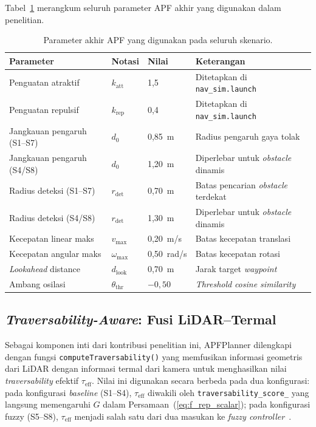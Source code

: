 Tabel~\ref{tab:param_apf} merangkum seluruh parameter APF akhir yang digunakan dalam penelitian.

\begin{table}[H]
\centering
\caption{Parameter akhir APF yang digunakan pada seluruh skenario.}
\label{tab:param_apf}
\begin{tabular}{lllp{5.5cm}}
\toprule
\textbf{Parameter} & \textbf{Notasi} & \textbf{Nilai} & \textbf{Keterangan} \\
\midrule
Penguatan atraktif   & $k_\text{att}$        & 1,5      & Ditetapkan di \texttt{nav\_sim.launch} \\
Penguatan repulsif   & $k_\text{rep}$        & 0,4      & Ditetapkan di \texttt{nav\_sim.launch} \\
Jangkauan pengaruh (S1--S7) & $d_0$         & 0,85~m   & Radius pengaruh gaya tolak \\
Jangkauan pengaruh (S4/S8)  & $d_0$         & 1,20~m   & Diperlebar untuk \textit{obstacle} dinamis \\
Radius deteksi (S1--S7) & $r_\text{det}$     & 0,70~m   & Batas pencarian \textit{obstacle} terdekat \\
Radius deteksi (S4/S8)  & $r_\text{det}$     & 1,30~m   & Diperlebar untuk \textit{obstacle} dinamis \\
Kecepatan linear maks  & $v_\text{max}$      & 0,20~m/s & Batas kecepatan translasi \\
Kecepatan angular maks & $\omega_\text{max}$ & 0,50~rad/s & Batas kecepatan rotasi \\
\textit{Lookahead} distance     & $d_\text{look}$     & 0,70~m   & Jarak target \textit{waypoint} \\
Ambang osilasi         & $\theta_\text{thr}$ & $-0{,}50$ & \textit{Threshold} \textit{cosine similarity} \\
\bottomrule
\end{tabular}
\end{table}

\subsection{\textit{Traversability-Aware}: Fusi LiDAR--Termal}
\label{sec:trav_aware}

Sebagai komponen inti dari kontribusi penelitian ini, APFPlanner dilengkapi dengan fungsi \texttt{computeTraversability()} yang memfusikan informasi geometris dari LiDAR dengan informasi termal dari kamera untuk menghasilkan nilai \textit{traversability} efektif $\tau_\text{eff}$. Nilai ini digunakan secara berbeda pada dua konfigurasi: pada konfigurasi \textit{baseline} (S1--S4), $\tau_\text{eff}$ diwakili oleh \texttt{traversability\_score\_} yang langsung memengaruhi $G$ dalam Persamaan~(\ref{eq:f_rep_scalar}); pada konfigurasi fuzzy (S5--S8), $\tau_\text{eff}$ menjadi salah satu dari dua masukan ke \textit{fuzzy controller}~\cite{Haider2022}.

